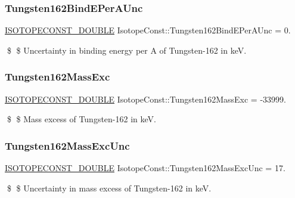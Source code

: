 \subsubsection{\texorpdfstring{Tungsten162\+Bind\+E\+Per\+A\+Unc}{Tungsten162BindEPerAUnc}}
{\footnotesize\ttfamily \mbox{\hyperlink{group___isotope_const-_macros_ga8f45a7272ce02c0b4c65c44636ed719a}{I\+S\+O\+T\+O\+P\+E\+C\+O\+N\+S\+T\+\_\+\+D\+O\+U\+B\+LE}} Isotope\+Const\+::\+Tungsten162\+Bind\+E\+Per\+A\+Unc = 0.}

\$ \$ Uncertainty in binding energy per A of Tungsten-\/162 in keV. \mbox{\label{group___isotope_const-_tungsten-_w162_gadfaed019ec3591c004aa2e4124a57673}} 
\subsubsection{\texorpdfstring{Tungsten162\+Mass\+Exc}{Tungsten162MassExc}}
{\footnotesize\ttfamily \mbox{\hyperlink{group___isotope_const-_macros_ga8f45a7272ce02c0b4c65c44636ed719a}{I\+S\+O\+T\+O\+P\+E\+C\+O\+N\+S\+T\+\_\+\+D\+O\+U\+B\+LE}} Isotope\+Const\+::\+Tungsten162\+Mass\+Exc = -\/33999.}

\$ \$ Mass excess of Tungsten-\/162 in keV. \mbox{\label{group___isotope_const-_tungsten-_w162_ga4c147ad9391bec23a42eae1e1ef9716a}} 
\subsubsection{\texorpdfstring{Tungsten162\+Mass\+Exc\+Unc}{Tungsten162MassExcUnc}}
{\footnotesize\ttfamily \mbox{\hyperlink{group___isotope_const-_macros_ga8f45a7272ce02c0b4c65c44636ed719a}{I\+S\+O\+T\+O\+P\+E\+C\+O\+N\+S\+T\+\_\+\+D\+O\+U\+B\+LE}} Isotope\+Const\+::\+Tungsten162\+Mass\+Exc\+Unc = 17.}

\$ \$ Uncertainty in mass excess of Tungsten-\/162 in keV. \mbox{\label{group___isotope_const-_tungsten-_w162_ga604fa73376fe9971109703d15ef65e6b}} 
